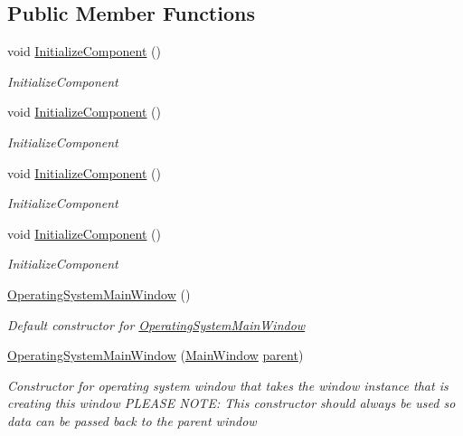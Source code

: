 \subsection*{Public Member Functions}
\begin{DoxyCompactItemize}
\item 
void \hyperlink{class_c_p_u___o_s___simulator_1_1_operating_system_main_window_abf657079159db7bb54ea7089f5b7b5db}{Initialize\+Component} ()
\begin{DoxyCompactList}\small\item\em Initialize\+Component \end{DoxyCompactList}\item 
void \hyperlink{class_c_p_u___o_s___simulator_1_1_operating_system_main_window_abf657079159db7bb54ea7089f5b7b5db}{Initialize\+Component} ()
\begin{DoxyCompactList}\small\item\em Initialize\+Component \end{DoxyCompactList}\item 
void \hyperlink{class_c_p_u___o_s___simulator_1_1_operating_system_main_window_abf657079159db7bb54ea7089f5b7b5db}{Initialize\+Component} ()
\begin{DoxyCompactList}\small\item\em Initialize\+Component \end{DoxyCompactList}\item 
void \hyperlink{class_c_p_u___o_s___simulator_1_1_operating_system_main_window_abf657079159db7bb54ea7089f5b7b5db}{Initialize\+Component} ()
\begin{DoxyCompactList}\small\item\em Initialize\+Component \end{DoxyCompactList}\item 
\hyperlink{class_c_p_u___o_s___simulator_1_1_operating_system_main_window_a6ebb63e5bf2709cb0281434c651845dc}{Operating\+System\+Main\+Window} ()
\begin{DoxyCompactList}\small\item\em Default constructor for \hyperlink{class_c_p_u___o_s___simulator_1_1_operating_system_main_window}{Operating\+System\+Main\+Window} \end{DoxyCompactList}\item 
\hyperlink{class_c_p_u___o_s___simulator_1_1_operating_system_main_window_a2e4a26004957e2b1f1c4376f0a6656ab}{Operating\+System\+Main\+Window} (\hyperlink{class_c_p_u___o_s___simulator_1_1_main_window}{Main\+Window} \hyperlink{class_c_p_u___o_s___simulator_1_1_operating_system_main_window_a0219ba1583d00852bea36ac27c9d878d}{parent})
\begin{DoxyCompactList}\small\item\em Constructor for operating system window that takes the window instance that is creating this window P\+L\+E\+A\+S\+E N\+O\+T\+E\+: This constructor should always be used so data can be passed back to the parent window \end{DoxyCompactList}\end{DoxyCompactItemize}
